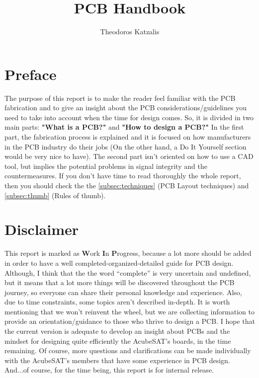 \documentclass[final]{cubedoc}
\title{PCB Handbook}
\author{Theodoros Katzalis}
\begin{document}
	
	\section{Preface}
	
	The purpose of this report is to make the reader feel familiar with the PCB fabrication  and to give an insight about the PCB considerations/guidelines you need to take into account when the time for design comes. So, it is divided in two main parts: \textbf{"What is a PCB?"} and \textbf{"How to design a PCB?"} In the first part, the fabrication process is explained and it is focused on how manufacturers in the PCB industry do their jobs (On the other hand, a Do It Yourself section would be very nice to have). The second part isn't oriented on how to use a CAD tool, but implies the potential problems in signal integrity and the countermeasures. If you don't have time to read thoroughly the whole report, then you should check the the \autoref{subsec:techniques} (PCB Layout techniques) and \autoref{subsec:thumb} (Rules of thumb).
	
	\section{Disclaimer}
	This report is marked as \textbf{W}ork \textbf{I}n \textbf{P}rogress, because a lot more should be added in order to have a well completed-organized-detailed guide for PCB design. Although, I think that the the word “complete” is very uncertain and undefined, but it means that a lot more things will be discovered throughout the PCB journey, so everyone can share their personal knowledge and experience. Also, due to time constraints, some topics aren’t described in-depth. It is worth mentioning that we won’t reinvent the wheel, but we are collecting information to provide an orientation/guidance to those who thrive to design a PCB. I hope that the current version is adequate to develop an insight about PCBs and the mindset for designing quite efficiently the AcubeSAT’s boards, in the time remaining. Of course, more questions and clarifications can be made individually with the AcubeSAT’s members that have some experience in PCB design. And...of course, for the time being, this report is for internal release. 
	
\end{document}

